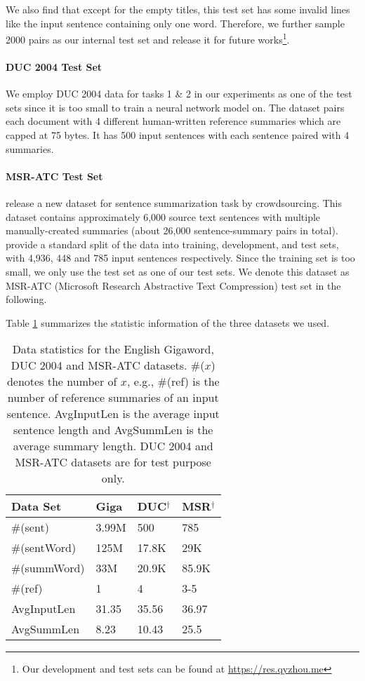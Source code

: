 \documentclass[11pt,a4paper]{article}
\begin{document}
We also find that except for the empty titles, this test set has some invalid lines like the input sentence containing only one word.
Therefore, we further sample 2000 pairs as our internal test set and release it for future works\footnote{Our development and test sets can be found at \url{https://res.qyzhou.me}}.
\paragraph{DUC 2004 Test Set}
We employ DUC 2004 data for tasks 1 \& 2 \citep{over2007duc} in our experiments as one of the test sets since it is too small to train a neural network model on.
The dataset pairs each document with 4 different human-written reference summaries which are capped at 75 bytes.
It has 500 input sentences with each sentence paired with 4 summaries.


\paragraph{MSR-ATC Test Set}
\citet{toutanova-EtAl:2016:EMNLP2016} release a new dataset for sentence summarization task by crowdsourcing.
This dataset contains approximately 6,000 source text sentences with multiple manually-created summaries (about 26,000 sentence-summary pairs in total).
\citet{toutanova-EtAl:2016:EMNLP2016} provide a standard split of the data into training, development, and test sets, with 4,936, 448 and 785 input sentences respectively.
Since the training set is too small, we only use the test set as one of our test sets.
We denote this dataset as MSR-ATC (Microsoft Research Abstractive Text Compression) test set in the following.


Table \ref{dataTable} summarizes the statistic information of the three datasets we used.

\begin{table}[htbp]
	\begin{center}
		\begin{tabular}{llll}
			\toprule
			\bf Data Set & Giga & DUC$ {}^{\dag} $ & MSR$ {}^{\dag} $ \\ 
			\midrule
			\#(sent) & 3.99M  & 500 & 785  \\
			\#(sentWord)  & 125M & 17.8K & 29K \\
			\#(summWord)  & 33M & 20.9K & 85.9K \\
			\#(ref) & 1 & 4 & 3-5  \\
			AvgInputLen & 31.35 & 35.56 & 36.97 \\
			AvgSummLen & 8.23 & 10.43 & 25.5 \\
			\bottomrule
		\end{tabular}
	\end{center}
	\caption{\label{dataTable} Data statistics for the English Gigaword, DUC 2004 and MSR-ATC datasets.
		\#($ x $) denotes the number of $ x $, e.g., \#(ref) is the number of reference summaries of an input sentence. AvgInputLen is the average input sentence length and AvgSummLen is the average summary length.
		\dag DUC 2004 and MSR-ATC datasets are for test purpose only.}
\end{table}
\end{document}
